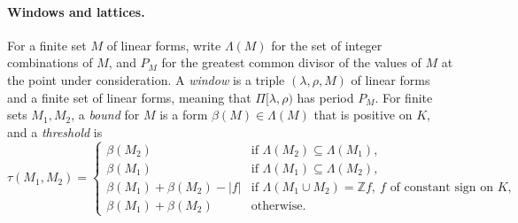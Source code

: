 \paragraph{Windows and lattices.} For a finite set \(M\) of linear forms, write \(\Lambda(M)\) for the set of integer combinations of \(M\), and \(P_M\) for the greatest common divisor of the values of \(M\) at the point under consideration. A \emph{window} is a triple \((\lambda,\rho,M)\) of linear forms and a finite set of linear forms, meaning that \(\Pi[\lambda,\rho)\) has period \(P_M\). For finite sets \(M_1,M_2\), a \emph{bound} for \(M\) is a form \(\beta(M)\in\Lambda(M)\) that is positive on \(K\), and a \emph{threshold} is
\[
\tau(M_1,M_2)=\begin{cases}
\beta(M_2)&\text{if }\Lambda(M_2)\subseteq\Lambda(M_1),\\
\beta(M_1)&\text{if }\Lambda(M_1)\subseteq\Lambda(M_2),\\
\beta(M_1)+\beta(M_2)-|f|&\text{if }\Lambda(M_1\cup M_2)=\mathbb Z f,\ f\text{ of constant sign on }K,\\
\beta(M_1)+\beta(M_2)&\text{otherwise.}
\end{cases}
\]

